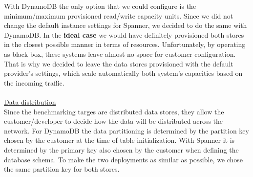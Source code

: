 \documentclass[letterpaper, 10 pt, conference]{ieeeconf}  %
\begin{document}
With DynamoDB the only option that we could configure is the minimum/maximum provisioned read/write capacity units. Since we did not change the default instance settings for Spanner, we decided to do the same with DynamoDB. In the \textbf{ideal case} we would have definitely provisioned both stores in the closest possible manner in terms of resources. Unfortunately, by operating as black-box, these systems leave almost no space for customer configuration. That is why we decided to leave the data stores provisioned with the default provider's settings, which scale automatically both system's capacities based on the incoming traffic. 
\\
\\
\underline{Data distribution}
\\
Since the benchmarking targes are distributed data stores, they allow the customer/developer to decide how the data will be distributed across the network. For DynamoDB the data partitioning is determined by the partition key chosen by the customer at the time of table initialization. With Spanner it is determined by the primary key also chosen by the customer when defining the database schema. To make the two deployments as similar as possible, we chose the same partition key for both stores.
\end{document}
